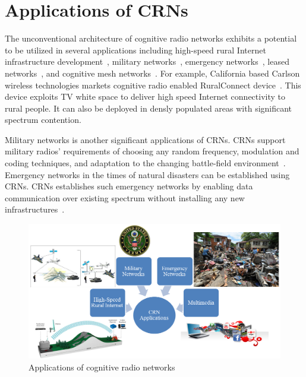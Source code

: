 \section{Applications of CRNs}
The unconventional architecture of cognitive radio networks exhibits a potential to be utilized in several applications including high-speed rural Internet infrastructure development~\cite{fitch2011wireless}, military networks~\cite{murty2003software}, emergency networks~\cite{maldonado2005cognitive}, leased networks~\cite{stine2005spectrum}, and cognitive mesh networks~\cite{berlemann2005policy}. For example, California based Carlson wireless technologies markets cognitive radio enabled RuralConnect device~\cite{ruralConnect}. This device exploits TV white space to deliver high speed Internet connectivity to rural people. It can also be deployed in densly populated areas with significant spectrum contention.

Military networks is another significant applications of CRNs. CRNs support military radios' requirements of choosing any random frequency, modulation and coding techniques, and adaptation to the changing battle-field environment~\cite{akyildiz2006next}. Emergency networks in the times of natural disasters can be established using CRNs. CRNs establishes such emergency networks by enabling data communication over existing spectrum without installing any new infrastructures~\cite{maldonado2005cognitive}.

\begin{figure}[!htbp]
    \begin{center}
        \includegraphics[width=1.0\textwidth]{myFigures/CRNApplications.png}
        \caption{Applications of cognitive radio networks~\cite{akyildiz2006next}}
        \label{fig:CRNApplications}
    \end{center}
\end{figure}

